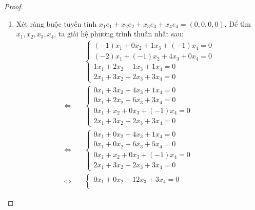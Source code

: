 \documentclass[class=linearalgebra,crop=false]{standalone}
\begin{document}
\begin{proof}
    \begin{enumerate}[label = (\alph*)]
        \item Xét ràng buộc tuyến tính $x_{1}e_{1} + x_{2}e_{2} + x_{3}e_{3} + x_{4}e_{4} = (0,0,0,0)$. Để tìm $x_{1}, x_{2}, x_{3}, x_{4}$, ta giải hệ phương trình thuần nhất sau:
              \begin{align*}
                                       & \begin{cases}
                                             (-1)x_{1} + 0x_{2} + 1x_{3} + (-1)x_{4} = 0 \\
                                             (-2)x_{1} + (-1)x_{2} + 4x_{3} + 0x_{4} = 0 \\
                                             1x_{1} + 2x_{2} + 1x_{3} + 1x_{4} = 0       \\
                                             2x_{1} + 3x_{2} + 2x_{3} + 3x_{4} = 0
                                         \end{cases} \\
                  \Leftrightarrow\quad &
                  \begin{cases}
                      0x_{1} + 3x_{2} + 4x_{3} + 1x_{4} = 0   \\
                      0x_{1} + 2x_{2} + 6x_{3} + 3x_{4} = 0   \\
                      0x_{1} + x_{2} + 0x_{3} + (-1)x_{4} = 0 \\
                      2x_{1} + 3x_{2} + 2x_{3} + 3x_{4} = 0
                  \end{cases}                            \\
                  \Leftrightarrow\quad &
                  \begin{cases}
                      0x_{1} + 0x_{2} + 4x_{3} + 1x_{4} = 0   \\
                      0x_{1} + 0x_{2} + 6x_{3} + 5x_{4} = 0   \\
                      0x_{1} + x_{2} + 0x_{3} + (-1)x_{4} = 0 \\
                      2x_{1} + 3x_{2} + 2x_{3} + 3x_{4} = 0
                  \end{cases}                            \\
                  \Leftrightarrow\quad &
                  \begin{cases}
                      0x_{1} + 0x_{2} + 12x_{3} + 3x_{4} = 0  \\

\end{cases}
\end{align*}
\end{enumerate}
\end{proof}
\end{document}
